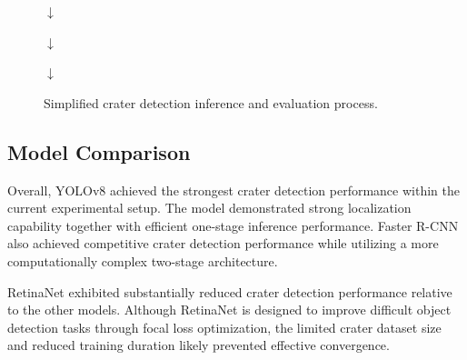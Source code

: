 \documentclass[conference]{IEEEtran}
\begin{document}
	\begin{figure}[h]
		\centering
		
		
		\vspace{0.15cm}
		
		$\downarrow$
		
		\vspace{0.15cm}
		
		
		\vspace{0.15cm}
		
		$\downarrow$
		
		\vspace{0.15cm}
		
		
		\vspace{0.15cm}
		
		$\downarrow$
		
		\vspace{0.15cm}
		
		
		\caption{Simplified crater detection inference and evaluation process.}
		\label{fig:detection_pipeline}
		
	\end{figure}
	
	\subsection{Model Comparison}
	
	Overall, YOLOv8 achieved the strongest crater detection performance within the current experimental setup. The model demonstrated strong localization capability together with efficient one-stage inference performance. Faster R-CNN also achieved competitive crater detection performance while utilizing a more computationally complex two-stage architecture.
	
	RetinaNet exhibited substantially reduced crater detection performance relative to the other models. Although RetinaNet is designed to improve difficult object detection tasks through focal loss optimization, the limited crater dataset size and reduced training duration likely prevented effective convergence.
	
\end{document}
